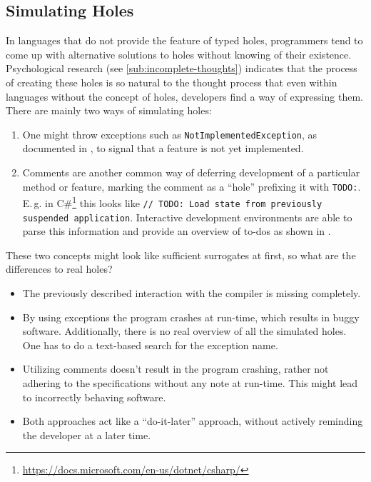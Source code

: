 \subsection{Simulating Holes}
In languages that do not provide the feature of typed holes, programmers tend to come up with alternative solutions to holes without knowing of their existence.
Psychological research (see \cref{sub:incomplete-thoughts}) indicates that the process of creating these holes is so natural to the thought process that even within languages without the concept of holes, developers find a way of expressing them.
There are mainly two ways of simulating holes:
\begin{enumerate}
\item One might throw exceptions such as \verb|NotImplementedException|, as documented in \textcite{microsoft_notimplementedexception_2020}, to signal that a feature is not yet implemented.
\item Comments are another common way of deferring development of a particular method or feature, marking the comment as a ``hole'' prefixing it with \verb|TODO:|. E.\,g. in C\#\footnote{\url{https://docs.microsoft.com/en-us/dotnet/csharp/}} this looks like \verb|// TODO: Load state from previously suspended application|. Interactive development environments are able to parse this information and provide an overview of to-dos as shown in \textcite{hogensen_use_2019}.
\end{enumerate}
These two concepts might look like sufficient surrogates at first, so what are the differences to real holes?
\begin{itemize}
    \item The previously described interaction with the compiler is missing completely.
    \item By using exceptions the program crashes at run-time, which results in buggy software. Additionally, there is no real overview of all the simulated holes. One has to do a text-based search for the exception name.
    \item Utilizing comments doesn't result in the program crashing, rather not adhering to the specifications without any note at run-time. This might lead to incorrectly behaving software.
    \item Both approaches act like a ``do-it-later'' approach, without actively reminding the developer at a later time.
\end{itemize}

